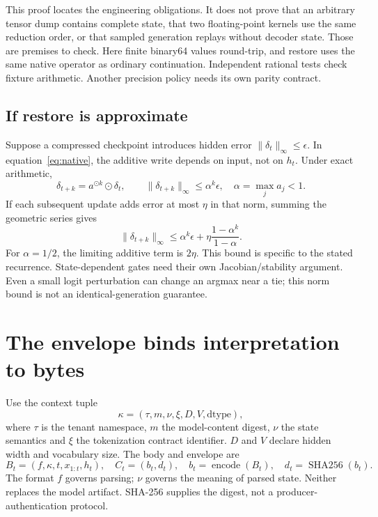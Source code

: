 This proof locates the engineering obligations. It does not prove that
an arbitrary tensor dump contains complete state, that two floating-point
kernels use the same reduction order, or that sampled generation replays
without decoder state. Those are premises to check.
Here finite binary64 values round-trip, and restore uses the same native
operator as ordinary continuation. Independent rational tests check fixture
arithmetic. Another precision policy needs its own parity contract.

\subsection{If restore is approximate}

Suppose a compressed checkpoint introduces hidden error
$\|\delta_t\|_\infty\le\epsilon$. In equation~\ref{eq:native}, the additive
write depends on input, not on $h_t$. Under exact arithmetic,
\begin{equation}
 \delta_{t+k}=a^{\odot k}\odot\delta_t,\qquad
 \|\delta_{t+k}\|_\infty\le\alpha^k\epsilon,\quad
 \alpha=\max_j a_j<1.
 \label{eq:error}
\end{equation}
If each subsequent update adds error at most $\eta$ in that norm, summing
the geometric series gives
\begin{equation}
 \|\delta_{t+k}\|_\infty
 \le\alpha^k\epsilon+\eta\frac{1-\alpha^k}{1-\alpha}.
\end{equation}
For $\alpha=1/2$, the limiting additive term is $2\eta$.
This bound is specific to the stated recurrence. State-dependent gates need
their own Jacobian/stability argument. Even a small logit perturbation can
change an argmax near a tie; this norm bound is not an identical-generation
guarantee.

\section{The envelope binds interpretation to bytes}

Use the context tuple
\[
 \kappa=(\tau,m,\nu,\xi,D,V,\mathrm{dtype}),
\]
where $\tau$ is the tenant namespace, $m$ the model-content digest, $\nu$ the
state semantics and $\xi$ the tokenization contract identifier. $D$ and $V$
declare hidden width and vocabulary size. The body and envelope are
\begin{equation}
 B_t=(f,\kappa,t,x_{1:t},h_t),\quad
 C_t=(b_t,d_t),\quad b_t=\operatorname{encode}(B_t),\quad
 d_t=\operatorname{SHA256}(b_t).
 \label{eq:envelope}
\end{equation}
The format $f$ governs parsing; $\nu$ governs the meaning of parsed state.
Neither replaces the model artifact. SHA-256 supplies the digest, not a
producer-authentication protocol.\cite{nist}


